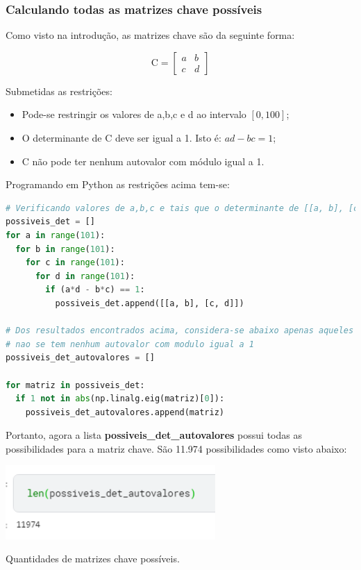 \documentclass[a4paper, 12pt]{article}
\begin{document}
\subsubsection{Calculando todas as matrizes chave possíveis}

Como visto na introdução, as matrizes chave são da seguinte forma:

$$\mathrm{C}=\begin{bmatrix}
a&b\\
c&d
\end{bmatrix}$$

Submetidas as restrições:

\begin{itemize}
    \item Pode-se restringir os valores de a,b,c e d ao intervalo $[0, 100]$;
    \item O determinante de $\mathrm{C}$ deve ser igual a 1. Isto é: $ad-bc=1$;
    \item $\mathrm{C}$ não pode ter nenhum autovalor com módulo igual a 1.
\end{itemize}

Programando em Python as restrições acima tem-se:\\

\begin{lstlisting}[language=Python, caption = Filtrando valores com base nas restrições]
# Verificando valores de a,b,c e tais que o determinante de [[a, b], [c, d]] e igual a 1
possiveis_det = []
for a in range(101):
  for b in range(101):
    for c in range(101):
      for d in range(101):
        if (a*d - b*c) == 1:
          possiveis_det.append([[a, b], [c, d]])

# Dos resultados encontrados acima, considera-se abaixo apenas aqueles em que
# nao se tem nenhum autovalor com modulo igual a 1
possiveis_det_autovalores = []

for matriz in possiveis_det:
  if 1 not in abs(np.linalg.eig(matriz)[0]):
    possiveis_det_autovalores.append(matriz)
\end{lstlisting}

Portanto, agora a lista \textbf{possiveis\_det\_autovalores} possui todas as possibilidades para a matriz chave. São 11.974 possibilidades como visto abaixo:

\begin{center}
    \includegraphics[width=8cm]{04_len_possiveis_det_autovalores.PNG}
    
    Quantidades de matrizes chave possíveis.
\end{center}
\end{document}
